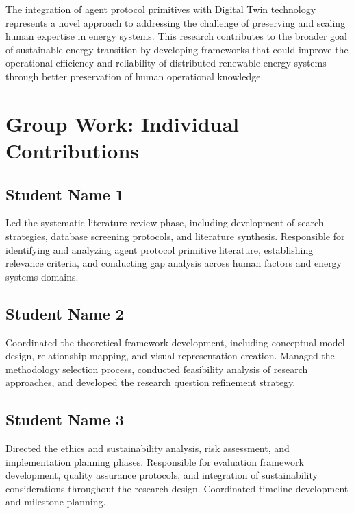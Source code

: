 \documentclass[12pt,a4paper]{article}
\begin{document}
The integration of agent protocol primitives with Digital Twin technology represents a novel approach to addressing the challenge of preserving and scaling human expertise in energy systems. This research contributes to the broader goal of sustainable energy transition by developing frameworks that could improve the operational efficiency and reliability of distributed renewable energy systems through better preservation of human operational knowledge.

\printbibliography

\section*{Group Work: Individual Contributions}
\label{sec:contributions}

\subsection*{Student Name 1}
Led the systematic literature review phase, including development of search strategies, database screening protocols, and literature synthesis. Responsible for identifying and analyzing agent protocol primitive literature, establishing relevance criteria, and conducting gap analysis across human factors and energy systems domains.

\subsection*{Student Name 2}
Coordinated the theoretical framework development, including conceptual model design, relationship mapping, and visual representation creation. Managed the methodology selection process, conducted feasibility analysis of research approaches, and developed the research question refinement strategy.

\subsection*{Student Name 3}
Directed the ethics and sustainability analysis, risk assessment, and implementation planning phases. Responsible for evaluation framework development, quality assurance protocols, and integration of sustainability considerations throughout the research design. Coordinated timeline development and milestone planning.
\end{document}
